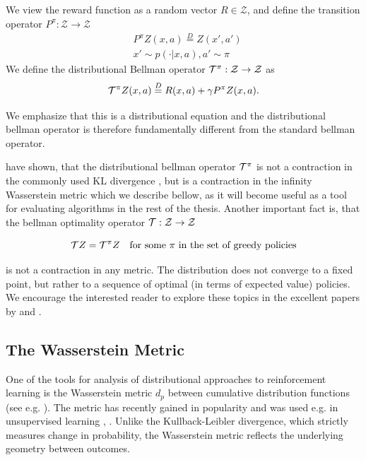 We view the reward function as a random vector $R \in \mathcal{Z}$, and define the transition operator $P^\pi : \mathcal{Z} \to \mathcal{Z}$
\begin{equation}
\begin{split}
&P^\pi Z(x, a) \overset{D}{=} Z(x', a')\\
&x' \sim p(\cdot|x, a), a' \sim \pi
\end{split}
\end{equation}
We define the distributional Bellman operator $\mathcal{T}^\pi : \mathcal{Z} \to \mathcal{Z}$ as
\begin{equation}
\mathcal{T}^\pi Z(x,a) \overset{D}{=} R(x,a) + \gamma P^\pi Z(x,a).
\end{equation}

We emphasize that this is a distributional equation and the distributional bellman operator is therefore fundamentally different from the standard bellman operator.

\citet{bellemare2017distributional} have shown, that the distributional bellman operator $\mathcal{T}^\pi$ is not a contraction in the commonly used KL divergence \cite{kl}, but is a contraction in the infinity Wasserstein metric which we describe bellow, as it will become useful as a tool for evaluating algorithms in the rest of the thesis. Another important fact is, that the bellman optimality operator $\mathcal{T} : \mathcal{Z}\to\mathcal{Z}$

\begin{equation}
\mathcal{T} Z = \mathcal{T}^\pi Z \quad \text{for some } \pi \text{ in the set of greedy policies}
\end{equation}

is not a contraction in any metric. The distribution does not converge to a fixed point, but rather to a sequence of optimal (in terms of expected value) policies. We encourage the interested reader to explore these topics in the excellent papers by \citet{bellemare2017distributional} and \citet{dabney2017distributional}.

\subsection{The Wasserstein Metric}
\newcommand{\pnorm}[1]{\| #1 \|_p}

One of the tools for analysis of distributional approaches to reinforcement learning is the Wasserstein metric $d_p$ between cumulative distribution functions (see e.g. \citet{billingsley2008probability}). The metric has recently gained in popularity and was used e.g. in unsupervised learning \citep{arjovsky2017wasserstein}, \citep{bellemare2017cramer}. Unlike the Kullback-Leibler divergence, which strictly measures change in probability, the Wasserstein metric reflects the underlying geometry between outcomes.

